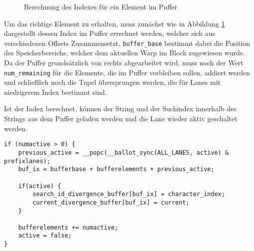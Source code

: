 \begin{figure}[ht]
	\caption{Berechnung des Indexes für ein Element im Puffer}
	\label{fig:buffer_index}
\end{figure}

Um das richtige Element zu erhalten, muss zunächst wie in Abbildung \ref{fig:buffer_index} dargestellt dessen Index im Puffer errechnet werden, welcher sich aus verschiedenen Offsets Zusammensetzt.
\texttt{buffer\_base} bestimmt dabei die Position des Speicherbereichs, welcher dem aktuellen Warp im Block zugewiesen wurde.
Da der Puffer grundsätzlich von rechts abgearbeitet wird, muss noch der Wert \texttt{num\_remaining} für die Elemente, die im Puffer verbleiben sollen, addiert werden und schließlich noch die Tupel übersprungen werden, die für Lanes mit niedrigerem Index bestimmt sind.

Ist der Index berechnet, können der String und der Suchindex innerhalb des Strings aus dem Puffer geladen werden und die Lane wieder aktiv geschaltet werden.

\begin{lstlisting}[language=MyC++,
caption={Auslagern übriger, aktiver Lanes in den Puffer},
label=flush_code]
if (numactive > 0) {
	previous_active = __popc(__ballot_sync(ALL_LANES, active) & prefixlanes);
	buf_ix = bufferbase + bufferelements + previous_active;
	
	if(active) {
		search_id_divergence_buffer[buf_ix] = character_index;
		current_divergence_buffer[buf_ix] = current;
	}
	
	bufferelements += numactive;
	active = false;
}
\end{lstlisting}

